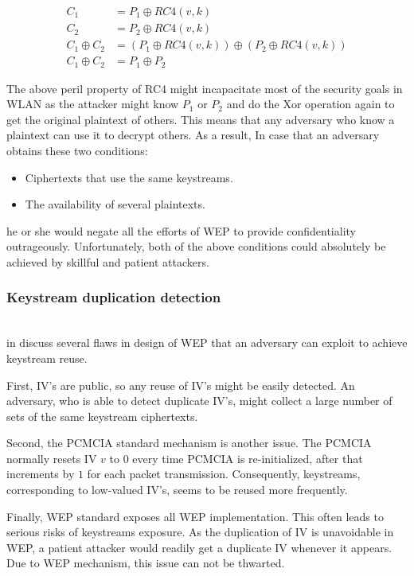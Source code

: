 \begin{align}
	C_1 &= P_1 \oplus RC4(v,k)\\
	C_2 &= P_2 \oplus RC4(v,k) \\
	C_1 \oplus C_2 &= (P_1 \oplus RC4(v,k)) \oplus (P_2 \oplus RC4(v,k))\\
	C_1 \oplus C_2 &= P_1 \oplus P_2
\end{align}

The above peril property of \ac{RC4} might incapacitate most of the security goals in \ac{WLAN} as the attacker might know $P_1$ or $P_2$ and do the \ac{Xor} operation again to get the original plaintext of others. This means that any adversary who know a plaintext can use it to decrypt others. As a result, In case that an adversary obtains these two conditions:
\begin{itemize}
	\item Ciphertexts that use the same keystreams.
	\item The availability of several plaintexts.
\end{itemize}
he or she would negate all the efforts of \ac{WEP} to provide confidentiality  outrageously. Unfortunately, both of the above conditions could absolutely be achieved by skillful and patient attackers.


\subsubsection{Keystream duplication detection}~\\
\citeauthor{borisov2001intercepting} in \cite{borisov2001intercepting} discuss several flaws in design of WEP that an adversary can exploit to achieve keystream reuse. 

First, \ac{IV}'s are public, so any reuse of \ac{IV}'s might be easily detected. An adversary, who is able to detect duplicate \ac{IV}'s, might collect a large number of sets of the same keystream ciphertexts. 

Second, the \ac{PCMCIA} standard mechanism is another issue. The \ac{PCMCIA} normally resets \ac{IV} $v$ to $0$ every time \ac{PCMCIA} is re-initialized, after that increments by $1$ for each packet transmission. Consequently, keystreams, corresponding to low-valued \ac{IV}'s, seems to be reused more frequently. 

Finally, \ac{WEP} standard exposes all \ac{WEP} implementation. This often leads to serious risks of keystreams exposure. As the duplication of \ac{IV} is unavoidable in \ac{WEP}, a patient attacker would readily get a duplicate \ac{IV} whenever it appears. Due to \ac{WEP} mechanism, this issue can not be thwarted.

